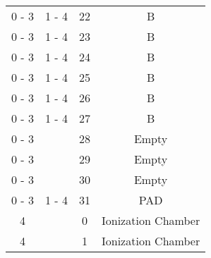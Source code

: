 \begin{tabular}{cccc}
0 - 3  &  1 - 4   &  22     &  B                    		   					\\
0 - 3  &  1 - 4   &  23     &  B                    		   					\\
0 - 3  &  1 - 4   &  24     &  B                    		   					\\
0 - 3  &  1 - 4   &  25     &  B                    		   					\\
0 - 3  &  1 - 4   &  26     &  B                    		   					\\
0 - 3  &  1 - 4   &  27     &  B                    		   					\\
0 - 3  &          &  28     &  Empty                		   					\\
0 - 3  &          &  29     &  Empty                		   					\\
0 - 3  &          &  30     &  Empty                		   					\\
0 - 3  &  1 - 4   &  31     &  PAD                  		   					\\
  4    &          &  0      &  Ionization Chamber   		   					\\
  4    &          &  1      &  Ionization Chamber   		   					\\
\hline
\end{tabular}
